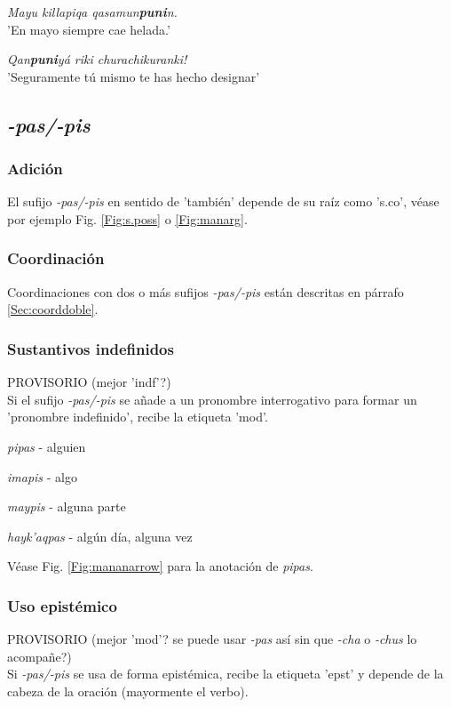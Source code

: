 \documentclass[a4paper,11pt,DIV12]{scrartcl}
\begin{document}
\begin{examples}
 \item {\em Mayu killapiqa qasamun\textbf{puni}n.}\\
	'En mayo siempre cae helada.'
 \item {\em Qan\textbf{puni}y\'a riki churachikuranki!}\\
	'Seguramente t\'u mismo te has hecho designar'\\
      		\hfill{\small \citep[244]{Cusi2}}
\end{examples}


 \subsection{{\em-pas/-pis}}
\subsubsection{Adici\'on}
 El sufijo {\em -pas/-pis} en sentido de 'tambi\'en' depende de su ra\'iz como 's.co', v\'ease por ejemplo Fig. \ref{Fig:s.poss} o \ref{Fig:manarg}.
\subsubsection{Coordinaci\'on}
Coordinaciones con dos o m\'as sufijos {\em -pas/-pis} est\'an descritas en p\'arrafo \ref{Sec:coorddoble}.
 \subsubsection{Sustantivos indefinidos}
 PROVISORIO (mejor 'indf'?) \\
Si el sufijo {\em -pas/-pis} se a\~nade a un pronombre interrogativo para formar un 'pronombre indefinido', recibe la etiqueta 'mod'.
\begin{examples}
 \item {\em pipas} - alguien
  \item {\em imapis} - algo
 \item {\em maypis} - alguna parte
\item {\em hayk'aqpas} - alg\'un d\'ia, alguna vez
\end{examples}

V\'ease Fig. \ref{Fig:mananarrow} para la anotaci\'on de {\em pipas}.
\subsubsection{Uso epist\'emico}
PROVISORIO (mejor 'mod'? se puede usar {\em -pas} as\'i sin que {\em -cha} o {\em -chus} lo acompa\~ne?)\\
Si {\em -pas/-pis} se usa de forma epist\'emica, recibe la etiqueta 'epst' y depende de la cabeza de la oraci\'on (mayormente el verbo). 
\end{document}
